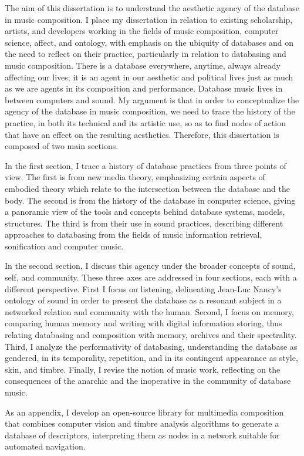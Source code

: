 The aim of this dissertation is to understand the aesthetic agency of the database in music composition. I place my dissertation in relation to existing scholarship, artists, and developers working in the fields of music composition, computer science, affect, and ontology, with emphasis on the ubiquity of databases and on the need to reflect on their practice, particularly in relation to databasing and music composition. There is a database everywhere, anytime, always already affecting our lives; it is an agent in our aesthetic and political lives just as much as we are agents in its composition and performance. Database music lives in between computers and sound. My argument is that in order to conceptualize the agency of the database in music composition, we need to trace the history of the practice, in both its technical and its artistic use, so as to find nodes of action that have an effect on the resulting aesthetics. Therefore, this dissertation is composed of two main sections.

In the first section, I trace a history of database practices from three points of view. The first is from new media theory, emphasizing certain aspects of embodied theory which relate to the intersection between the database and the body. The second is from the history of the database in computer science, giving a panoramic view of the tools and concepts behind database systems, models, structures. The third is from their use in sound practices, describing different approaches to databasing from the fields of music information retrieval, sonification and computer music. 

In the second section, I discuss this agency under the broader concepts of sound, self, and community. These three axes are addressed in four sections, each with a different perspective. First I focus on listening, delineating Jean-Luc Nancy's ontology of sound in order to present the database as a resonant subject in a networked relation and community with the human. Second, I focus on memory, comparing human memory and writing with digital information storing, thus relating databasing and composition with memory, archives and their spectrality. Third, I analyze the performativity of databasing, understanding the database as gendered, in its temporality, repetition, and in its contingent appearance as style, skin, and timbre. Finally, I revise the notion of music work, reflecting on the consequences of the anarchic and the inoperative in the community of database music.

As an appendix, I develop an open-source library for multimedia composition that combines computer vision and timbre analysis algorithms to generate a database of descriptors, interpreting them as nodes in a network suitable for automated navigation.
